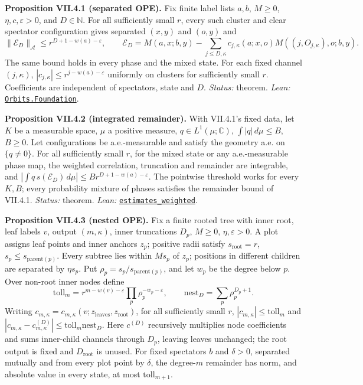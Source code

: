\documentclass[
  letterpaper,
  11pt]{article}
\begin{document}
\textbf{Proposition VII.4.1 (separated OPE).} Fix finite label lists
\(a,b\), \(M\ge0\), \(\eta,c,\varepsilon>0\), and \(D\in\mathbb N\). For
all sufficiently small \(r\), every such cluster and clear spectator
configuration gives separated \((x,y)\) and \((o,y)\) and
\[\|\mathcal E_D\|_{\mathcal A}\le r^{D+1-w(a)-\varepsilon},\qquad
\mathcal E_D=M(a,x;b,y)-\sum_{j\le D,\kappa}c_{j,\kappa}(a;x,o)M((j,O_{j,\kappa}),o;b,y).\]
The same bound holds in every phase and the mixed state. For each fixed
channel \((j,\kappa)\), \(|c_{j,\kappa}|\le r^{j-w(a)-\varepsilon}\)
uniformly on clusters for sufficiently small \(r\). Coefficients are
independent of spectators, state and \(D\). \emph{Status:} theorem.
\emph{Lean:}
\href{https://github.com/yang-mills-group/OpenAI-YM-20261028/blob/3456e5e75cf8d4cd558955a5c7638fba2d68f464/YM/OPE/Orbits/Kernel.lean\#L62-L64}{\texttt{Orbits.Foundation}}.

\textbf{Proposition VII.4.2 (integrated remainder).} With VII.4.1's
fixed data, let \(K\) be a measurable space, \(\mu\) a positive measure,
\(q\in L^1(\mu;\mathbb C)\), \(\int|q|\,d\mu\le B\), \(B\ge0\). Let
configurations be a.e.-measurable and satisfy the geometry a.e. on
\(\{q\ne0\}\). For all sufficiently small \(r\), for the mixed state or
any a.e.-measurable phase map, the weighted correlation, truncation and
remainder are integrable, and
\(|\int q\,s(\mathcal E_D)\,d\mu|\le Br^{D+1-w(a)-\varepsilon}\). The
pointwise threshold works for every \(K,B\); every probability mixture
of phases satisfies the remainder bound of VII.4.1. \emph{Status:}
theorem. \emph{Lean:}
\href{https://github.com/yang-mills-group/OpenAI-YM-20261028/blob/3456e5e75cf8d4cd558955a5c7638fba2d68f464/YM/OPE/Orbits/Profile.lean\#L98-L108}{\texttt{estimates\_weighted}}.

\textbf{Proposition VII.4.3 (nested OPE).} Fix a finite rooted tree with
inner root, leaf labels \(v\), output \((m,\kappa)\), inner truncations
\(D_p\), \(M\ge0\), \(\eta,\varepsilon>0\). A plot assigns leaf points
and inner anchors \(z_p\); positive radii satisfy
\(s_{\mathrm{root}}=r\), \(s_p\le s_{\mathrm{parent}(p)}\). Every
subtree lies within \(Ms_p\) of \(z_p\); positions in different children
are separated by \(\eta s_p\). Put
\(\rho_p=s_p/s_{\mathrm{parent}(p)}\), and let \(w_p\) be the degree
below \(p\). Over non-root inner nodes define
\[\mathrm{toll}_m=r^{m-w(v)-\varepsilon}\prod_p\rho_p^{-w_p-\varepsilon},\qquad \mathrm{nest}_D=\sum_p\rho_p^{D_p+1}.\]
Writing
\(c_{m,\kappa}=c_{m,\kappa}(v;z_{\mathrm{leaves}},z_{\mathrm{root}})\),
for all sufficiently small \(r\), \(|c_{m,\kappa}|\le\mathrm{toll}_m\)
and
\(|c_{m,\kappa}-c^{(D)}_{m,\kappa}|\le\mathrm{toll}_m\mathrm{nest}_D\).
Here \(c^{(D)}\) recursively multiplies node coefficients and sums
inner-child channels through \(D_p\), leaving leaves unchanged; the root
output is fixed and \(D_{\mathrm{root}}\) is unused. For fixed
spectators \(b\) and \(\delta>0\), separated mutually and from every
plot point by \(\delta\), the degree-\(m\) remainder has norm, and
absolute value in every state, at most \(\mathrm{toll}_{m+1}\).
\end{document}

